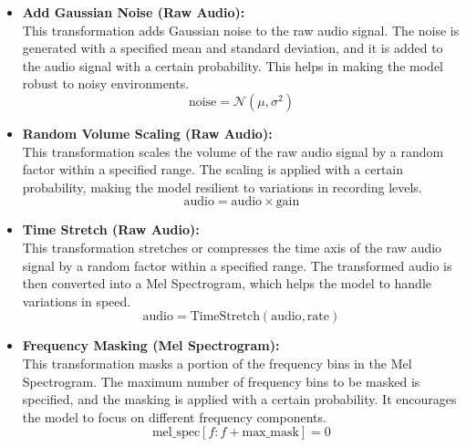       \begin{itemize}
            \item \textbf{Add Gaussian Noise (Raw Audio):}\\
            This transformation adds Gaussian noise to the raw audio signal. The noise is generated with a specified mean and standard deviation, and it is added to the audio signal with a certain probability. This helps in making the model robust to noisy environments.
            \begin{equation}
            \text{noise} = \mathcal{N}(\mu, \sigma^2)
            \end{equation}

            \item \textbf{Random Volume Scaling (Raw Audio):}\\
            This transformation scales the volume of the raw audio signal by a random factor within a specified range. The scaling is applied with a certain probability, making the model resilient to variations in recording levels.
            \begin{equation}
            \text{audio} = \text{audio} \times \text{gain}
            \end{equation}
            
            \item \textbf{Time Stretch (Raw Audio):}\\
            This transformation stretches or compresses the time axis of the raw audio signal by a random factor within a specified range. The transformed audio is then converted into a Mel Spectrogram, which helps the model to handle variations in speed.
            \begin{equation}
            \text{audio} = \text{TimeStretch}(\text{audio}, \text{rate})
            \end{equation}
            
            \item \textbf{Frequency Masking (Mel Spectrogram):}\\
            This transformation masks a portion of the frequency bins in the Mel Spectrogram. The maximum number of frequency bins to be masked is specified, and the masking is applied with a certain probability. It encourages the model to focus on different frequency components.
            \begin{equation}
            \text{mel\_spec}[f:f+\text{max\_mask}] = 0
            \end{equation}


\end{itemize}
